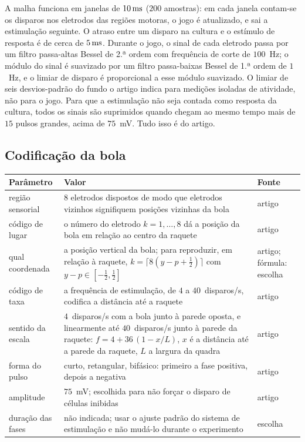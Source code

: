 A malha funciona em janelas de $10\,\text{ms}$ ($200$ amostras): em cada janela contam-se os disparos nos eletrodos das regiões motoras, o jogo é atualizado, e sai a estimulação seguinte. O atraso entre um disparo na cultura e o estímulo de resposta é de cerca de $5\,\text{ms}$. Durante o jogo, o sinal de cada eletrodo passa por um filtro passa-altas Bessel de 2.ª ordem com frequência de corte de $100$~Hz; o módulo do sinal é suavizado por um filtro passa-baixas Bessel de 1.ª ordem de $1$~Hz, e o limiar de disparo é proporcional a esse módulo suavizado. O limiar de seis desvios-padrão do fundo o artigo indica para medições isoladas de atividade, não para o jogo. Para que a estimulação não seja contada como resposta da cultura, todos os sinais são suprimidos quando chegam ao mesmo tempo mais de $15$ pulsos grandes, acima de $75$~mV. Tudo isso é do artigo.

\subsection*{Codificação da bola}

\begin{center}
\footnotesize
\setlength{\tabcolsep}{4pt}
\renewcommand{\arraystretch}{1.15}
\begin{tabular}{>{\raggedright}p{3.4cm}>{\raggedright}p{7.5cm}>{\raggedright\arraybackslash}p{1.6cm}}
\toprule
Parâmetro & Valor & Fonte \\
\midrule
região sensorial & $8$ eletrodos dispostos de modo que eletrodos vizinhos signifiquem posições vizinhas da bola & artigo \\
código de lugar & o número do eletrodo $k=1,\dots,8$ dá a posição da bola em relação ao centro da raquete & artigo \\
qual coordenada & a posição vertical da bola; para reproduzir, em relação à raquete, $k=\lceil 8(y-p+\tfrac12)\rceil$ com $y-p\in[-\tfrac12,\tfrac12]$ & artigo; fórmula: escolha \\
código de taxa & a frequência de estimulação, de $4$ a $40$~disparos/s, codifica a distância até a raquete & artigo \\
sentido da escala & $4$~disparos/s com a bola junto à parede oposta, e linearmente até $40$~disparos/s junto à parede da raquete: $f=4+36\,(1-x/L)$, $x$ é a distância até a parede da raquete, $L$ a largura da quadra & artigo \\
forma do pulso & curto, retangular, bifásico: primeiro a fase positiva, depois a negativa & artigo \\
amplitude & $75$~mV; escolhida para não forçar o disparo de células inibidas & artigo \\
duração das fases & não indicada; usar o ajuste padrão do sistema de estimulação e não mudá-lo durante o experimento & escolha \\
\bottomrule
\end{tabular}
\end{center}


